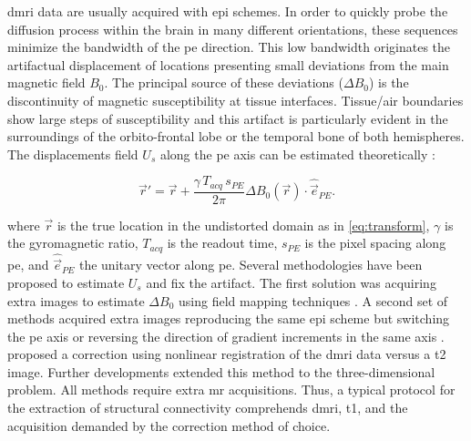\Gls*{dmri} data are usually acquired with \gls*{epi} schemes.
In order to quickly probe the diffusion process within the brain in many different orientations,
  these sequences minimize the bandwidth of the \gls*{pe} direction.
This low bandwidth originates the artifactual displacement of locations presenting small deviations
  from the main magnetic field $B_0$.
The principal source of these deviations ($\Delta B_0$) is the discontinuity of magnetic
  susceptibility at tissue interfaces.
Tissue/air boundaries show large steps of susceptibility and this artifact is
  particularly evident in the surroundings of the orbito-frontal lobe or the temporal
  bone of both hemispheres.
The displacements field $U_s$ along the \gls*{pe} axis can be estimated theoretically
  \citep{jezzard_correction_1995}:

  \begin{equation}
  \vec{r}' = \vec{r} + \frac{\gamma \, T_{acq}\, s_{PE}}{2\pi}\Delta B_0(\vec{r}) \cdot \hat{\vec{e}}_{PE}.
  \label{eq:fieldmap}
  \end{equation}

where $\vec{r}$ is the true location in the undistorted domain as in \eqref{eq:transform},
  $\gamma$ is the gyromagnetic ratio, $T_{acq}$ is the readout time,
  $s_{PE}$ is the pixel spacing along \gls*{pe}, and $\hat{\vec{e}}_{PE}$ the unitary
  vector along \gls*{pe}.
Several methodologies have been proposed to estimate $U_s$ and fix the artifact.
The first solution was acquiring extra images to estimate $\Delta B_0$ using field mapping
  techniques \citep{jezzard_correction_1995,andersson_modeling_2001}.
A second set of methods acquired extra images reproducing the same \gls*{epi} scheme but switching
  the \gls*{pe} axis \citep{chiou_simple_2000} or reversing the direction of gradient
  increments in the same axis \citep{cordes_geometric_2000,holland_efficient_2010}.
\cite{kybic_unwarping_2000} proposed a correction using nonlinear registration of the \gls*{dmri}
  data versus a \gls*{t2} image.
Further developments \citep{irfanoglu_susceptibility_2011} extended this method to the
  three-dimensional problem.
All methods require extra \gls*{mr} acquisitions. Thus, a typical protocol for the extraction
  of structural connectivity comprehends \gls*{dmri}, \gls*{t1}, and the acquisition demanded
  by the correction method of choice.

